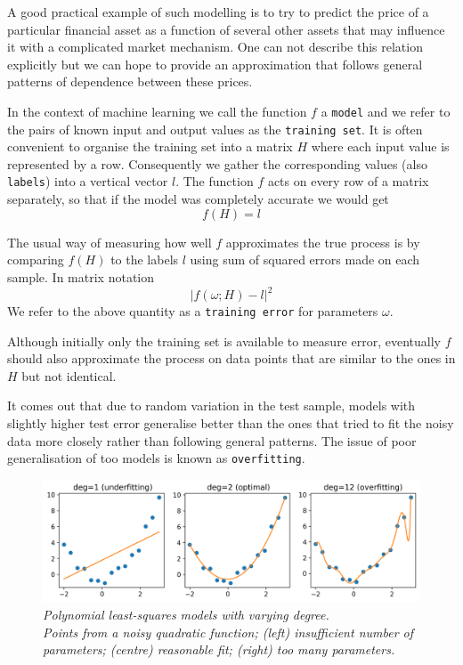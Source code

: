 \documentclass[a4paper,11pt]{article}
\theoremstyle{break}
\begin{document}
A good practical example of such modelling is to try to predict the price of a particular financial asset as a function of several other assets that may influence it with a complicated market mechanism. One can not describe this relation explicitly but we can hope to provide an approximation that follows general patterns of dependence between these prices.

In the context of machine learning we call the function $f$ a {\tt model} and we refer to the pairs of known input and output values as the {\tt training set}. It is often convenient to organise the training set into a matrix $H$ where each input value is represented by a row. Consequently we gather the corresponding values (also {\tt labels}) into a vertical vector $l$. The function $f$ acts on every row of a matrix separately, so that if the model was completely accurate we would get
    $$ f(H) = l $$

The usual way of measuring how well $f$ approximates the true process is by comparing $f(H)$ to the labels $l$ using sum of squared errors made on each sample. In matrix notation
$$ | f(\omega; H) - l |^2 $$
We refer to the above quantity as a {\tt training error} for parameters $\omega$.

Although initially only the training set is available to measure error, eventually $f$ should also approximate the process on data points that are similar to the ones in $H$ but not identical.

It comes out that due to random variation in the test sample,  models with slightly higher test error generalise better than the ones that tried to fit the noisy data more closely rather than following general patterns.
The issue of poor generalisation of too  models is known as {\tt overfitting}.

\begin{figure}[ph]
\centering
\captionsetup{width=0.8\linewidth}
\includegraphics[width=0.8\linewidth]{polyfit.png}
\caption[]{
    \textit{Polynomial least-squares models with varying degree. \\
    Points from a noisy quadratic function;
    (left) insufficient number of parameters;
    (centre) reasonable fit;
    (right) too many parameters.}
}
\end{figure} 
\end{document}
